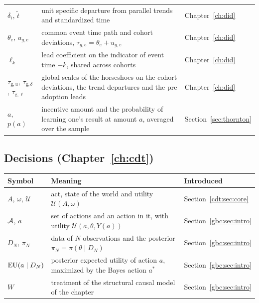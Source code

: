 {\noindent\small\centering
\setlength{\tabcolsep}{4pt}\renewcommand{\arraystretch}{1.1}
\begin{tabular}{>{\raggedright\arraybackslash}p{1.0in}>{\raggedright\arraybackslash}p{2.15in}>{\raggedright\arraybackslash}p{0.95in}}
$\delta_i$, $\tilde t$ & unit specific departure from parallel trends and standardized time & Chapter~\ref{ch:did} \\
$\theta_e$, $u_{g,e}$ & common event time path and cohort deviations, $\tau_{g,e} = \theta_e + u_{g,e}$ & Chapter~\ref{ch:did} \\
$\ell_k$ & lead coefficient on the indicator of event time $-k$, shared across cohorts & Chapter~\ref{ch:did} \\
$\tau_{\mathrm{g},u}$, $\tau_{\mathrm{g},\delta}$, $\tau_{\mathrm{g},\ell}$ & global scales of the horseshoes on the cohort deviations, the trend departures and the pre adoption leads & Chapter~\ref{ch:did} \\
$a$, $p(a)$ & incentive amount and the probability of learning one's result at amount $a$, averaged over the sample & Section~\ref{sec:thornton} \\
\bottomrule
\end{tabular}\par}

\subsection*{Decisions (Chapter~\ref{ch:cdt})}

{\noindent\small\centering
\setlength{\tabcolsep}{4pt}\renewcommand{\arraystretch}{1.1}
\begin{tabular}{>{\raggedright\arraybackslash}p{1.0in}>{\raggedright\arraybackslash}p{2.15in}>{\raggedright\arraybackslash}p{0.95in}}
\toprule
Symbol & Meaning & Introduced \\
\midrule
$A$, $\omega$, $\mathcal{U}$ & act, state of the world and utility $\mathcal{U}(A, \omega)$ & Section~\ref{cdt:sec:core} \\
$\mathcal{A}$, $a$ & set of actions and an action in it, with utility $\mathcal{U}(a, \theta, Y(a))$ & Section~\ref{gbc:sec:intro} \\
$D_N$, $\pi_N$ & data of $N$ observations and the posterior $\pi_N = \pi(\theta \mid D_N)$ & Section~\ref{gbc:sec:intro} \\
$\mathrm{EU}(a \mid D_N)$ & posterior expected utility of action $a$, maximized by the Bayes action $a^*$ & Section~\ref{gbc:sec:intro} \\
$W$ & treatment of the structural causal model of the chapter & Section~\ref{gbc:sec:intro} \\
\end{tabular}\par}

